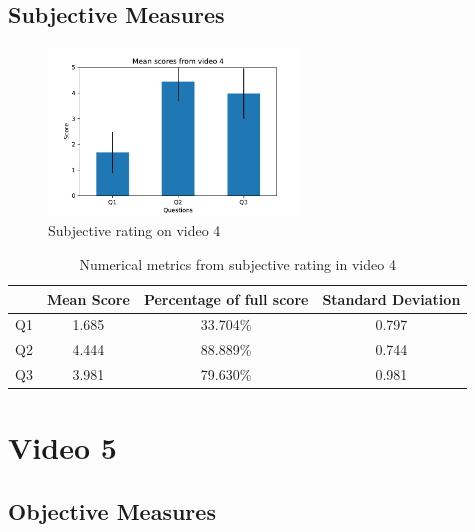 \subsection{Subjective Measures}

\begin{figure}[H]
    \centering
    \includegraphics[width=0.6\textwidth]{img/subjective_measures/analysis/video_4.pdf}
    \caption{Subjective rating on video 4}
    \label{fig:visual_subj_vid4}
\end{figure}

\begin{table}[H]
    \centering
    \begin{tabular}{|c|c c c|} 
        \hline
           & \textbf{Mean Score} & \textbf{Percentage of full score} & \textbf{Standard Deviation} \\ [0.5ex] 
        \hline
        Q1 & 1.685 & 33.704\% & 0.797 \\ [1ex] 
        Q2 & 4.444 & 88.889\% & 0.744 \\ [1ex] 
        Q3 & 3.981 & 79.630\% & 0.981 \\ [1ex] 
        \hline
    \end{tabular}
    \caption{Numerical metrics from subjective rating in video 4}
    \label{tab:numerical_subj_vid4}
\end{table}




\section{Video 5}
\subsection{Objective Measures}

